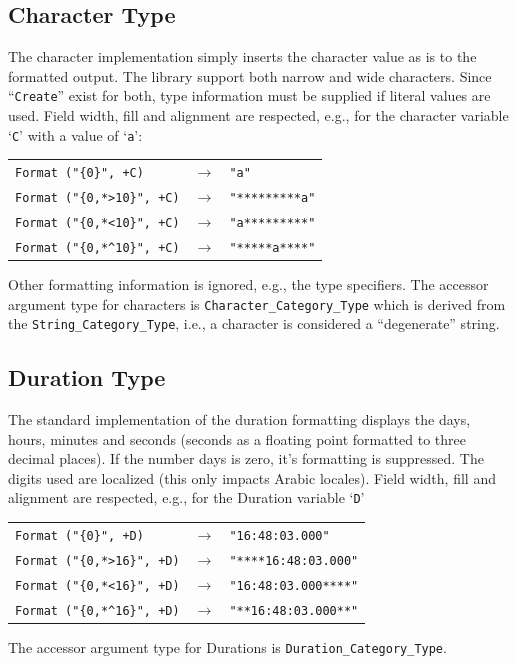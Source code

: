 \subsection{Character Type}

The character implementation simply inserts the character value as is
to the formatted output.  The library support both narrow and wide
characters.  Since ``\texttt{Create}'' exist for both, type information
must be supplied if literal values are used.  Field width, fill and
alignment are respected, e.g., for the character variable `\texttt{C}'
with a value of `\texttt{a}':
\begin{center}
\begin{tabular}{lll}
\verb|Format ("{0}", +C)| & $\rightarrow$ & \verb|"a"|\\
\verb|Format ("{0,*>10}", +C)| & $\rightarrow$ & \verb|"*********a"|\\
\verb|Format ("{0,*<10}", +C)| & $\rightarrow$ & \verb|"a*********"|\\
\verb|Format ("{0,*^10}", +C)| & $\rightarrow$ & \verb|"*****a****"|\\
\end{tabular}
\end{center}
Other formatting information is ignored, e.g., the type specifiers.  The
accessor argument type for characters is \texttt{Character\_Category\_Type}
which is derived from the \texttt{String\_Category\_Type}, i.e., a character
is considered a ``degenerate'' string.

\subsection{Duration Type}

The standard implementation of the duration formatting displays the days,
hours, minutes and seconds (seconds as a floating point formatted
to three decimal places).  If the number days is zero, it's formatting is
suppressed.  The digits used are localized (this only impacts
Arabic locales).  Field width, fill and alignment are respected, e.g., for
the Duration variable `\texttt{D}'
\begin{center}
\begin{tabular}{lll}
\verb|Format ("{0}", +D)| & $\rightarrow$ & \verb|"16:48:03.000"|\\
\verb|Format ("{0,*>16}", +D)| & $\rightarrow$ & \verb|"****16:48:03.000"|\\
\verb|Format ("{0,*<16}", +D)| & $\rightarrow$ & \verb|"16:48:03.000****"|\\
\verb|Format ("{0,*^16}", +D)| & $\rightarrow$ & \verb|"**16:48:03.000**"|\\
\end{tabular}
\end{center}
The accessor argument type for Durations is \texttt{Duration\_Category\_Type}.

